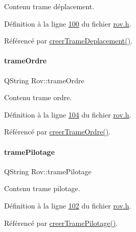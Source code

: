 Contenu trame déplacement. 



Définition à la ligne \hyperlink{rov_8h_source_l00100}{100} du fichier \hyperlink{rov_8h_source}{rov.\+h}.



Référencé par \hyperlink{rov_8cpp_source_l00208}{creer\+Trame\+Deplacement()}.

\mbox{\label{class_rov_aa813010d76738e268a4bbe3773663a38}} 
\paragraph{\texorpdfstring{trame\+Ordre}{trameOrdre}}
{\footnotesize\ttfamily Q\+String Rov\+::trame\+Ordre\hspace{0.3cm}{\ttfamily [private]}}



Contenu trame ordre. 



Définition à la ligne \hyperlink{rov_8h_source_l00104}{104} du fichier \hyperlink{rov_8h_source}{rov.\+h}.



Référencé par \hyperlink{rov_8cpp_source_l00230}{creer\+Trame\+Ordre()}.

\mbox{\label{class_rov_a379b288ce69a0bb9eaac8f673db8ae07}} 
\paragraph{\texorpdfstring{trame\+Pilotage}{tramePilotage}}
{\footnotesize\ttfamily Q\+String Rov\+::trame\+Pilotage\hspace{0.3cm}{\ttfamily [private]}}



Contenu trame pilotage. 



Définition à la ligne \hyperlink{rov_8h_source_l00102}{102} du fichier \hyperlink{rov_8h_source}{rov.\+h}.



Référencé par \hyperlink{rov_8cpp_source_l00219}{creer\+Trame\+Pilotage()}.

\mbox{\label{class_rov_a2c24d7c884d8fae07e452105037f8e2c}} 
